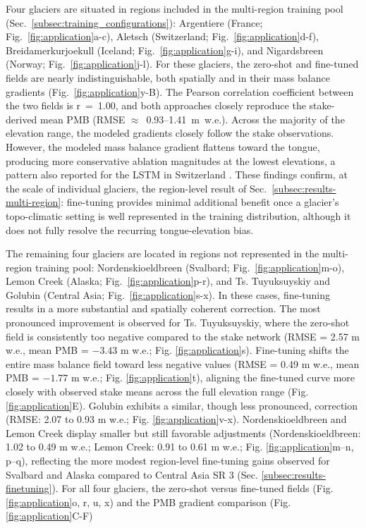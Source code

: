 \documentclass[draft]{agujournal2019}
\begin{document}
Four glaciers are situated in regions included in the multi-region training pool (Sec.~\ref{subsec:training_configurations}): Argentiere (France; Fig.~\ref{fig:application}a-c), Aletsch (Switzerland; Fig.~\ref{fig:application}d-f), Breidamerkurjoekull (Iceland; Fig.~\ref{fig:application}g-i), and Nigardsbreen (Norway; Fig.~\ref{fig:application}j-l). For these glaciers, the zero-shot and fine-tuned fields are nearly indistinguishable, both spatially and in their mass balance gradients (Fig.~\ref{fig:application}y-B). The Pearson correlation coefficient between the two fields is r~=~1.00, and both approaches closely reproduce the stake-derived mean PMB (RMSE $\approx$~0.93--1.41~m~w.e.). Across the majority of the elevation range, the modeled gradients closely follow the stake observations. However, the modeled mass balance gradient flattens toward the tongue, producing more conservative ablation magnitudes at the lowest elevations, a pattern also reported for the LSTM in Switzerland \citep{vanderMeer_2026}. These findings confirm, at the scale of individual glaciers, the region-level result of Sec.~\ref{subsec:results-multi-region}: fine-tuning provides minimal additional benefit once a glacier's topo-climatic setting is well represented in the training distribution, although it does not fully resolve the recurring tongue-elevation bias.

The remaining four glaciers are located in regions not represented in the multi-region training pool: Nordenskioeldbreen (Svalbard; Fig.~\ref{fig:application}m-o), Lemon Creek (Alaska; Fig.~\ref{fig:application}p-r), and Ts. Tuyuksuyskiy and Golubin (Central Asia; Fig.~\ref{fig:application}s-x). In these cases, fine-tuning results in a more substantial and spatially coherent correction. The most pronounced improvement is observed for Ts. Tuyuksuyskiy, where the zero-shot field is consistently too negative compared to the stake network (RMSE = 2.57 m w.e., mean PMB = $-3.43$ m w.e.; Fig. \ref{fig:application}s). Fine-tuning shifts the entire mass balance field toward less negative values (RMSE = 0.49 m w.e., mean PMB = $-1.77$ m w.e.; Fig. \ref{fig:application}t), aligning the fine-tuned curve more closely with observed stake means across the full elevation range (Fig. \ref{fig:application}E). Golubin exhibits a similar, though less pronounced, correction (RMSE: 2.07 to 0.93 m w.e.; Fig. \ref{fig:application}v-x). Nordenskioeldbreen and Lemon Creek display smaller but still favorable adjustments (Nordenskioeldbreen: 1.02 to 0.49 m w.e.; Lemon Creek: 0.91 to 0.61 m w.e.; Fig. \ref{fig:application}m--n, p--q), reflecting the more modest region-level fine-tuning gains observed for Svalbard and Alaska compared to Central Asia SR 3 (Sec. \ref{subsec:results-finetuning}). For all four glaciers, the zero-shot versus fine-tuned fields (Fig. \ref{fig:application}o, r, u, x) and the PMB gradient comparison (Fig. \ref{fig:application}C-F)  
\end{document}
